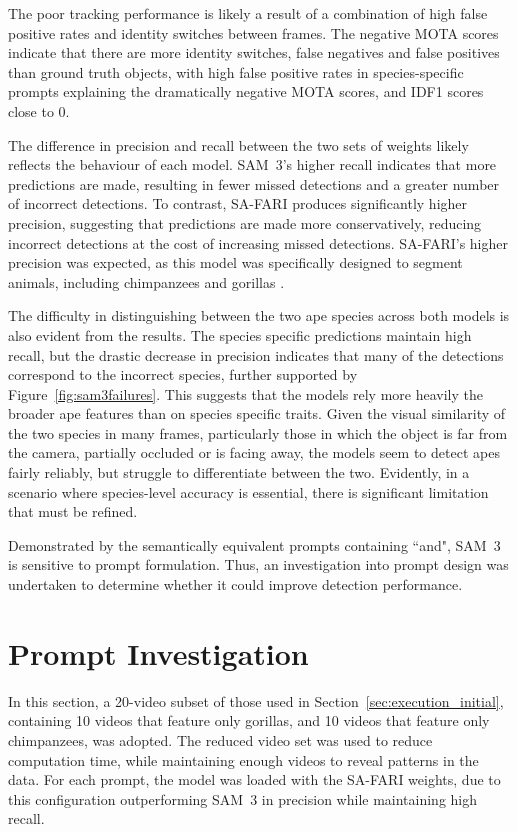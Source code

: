 \documentclass[author={Jacob Stephenson},
    degree={BSc},
    title={Robust Great Ape Species Detection in Wild Camera Trap Imagery with Promptable Concept Segmentation},
    unit={COMS30045},
    subtitle={}]{dissertation}
\begin{document}
The poor tracking performance is likely a result of a combination of high false positive rates and identity switches between frames. The negative MOTA scores indicate that there are more identity switches, false negatives and false positives than ground truth objects, with high false positive rates in species-specific prompts explaining the dramatically negative MOTA scores, and IDF1 scores close to 0.

The difference in precision and recall between the two sets of weights likely reflects the behaviour of each model. SAM~3's higher recall indicates that more predictions are made, resulting in fewer missed detections and a greater number of incorrect detections. To contrast, SA-FARI produces significantly higher precision, suggesting that predictions are made more conservatively, reducing incorrect detections at the cost of increasing missed detections. SA-FARI's higher precision was expected, as this model was specifically designed to segment animals, including chimpanzees and gorillas \cite{wasmuht2025safaridatasetsegmentfootage}.


The difficulty in distinguishing between the two ape species across both models is also evident from the results. The species specific predictions maintain high recall, but the drastic decrease in precision indicates that many of the detections correspond to the incorrect species, further supported by Figure~\ref{fig:sam3failures}. This suggests that the models rely more heavily the broader ape features than on species specific traits. Given the visual similarity of the two species in many frames, particularly those in which the object is far from the camera, partially occluded or is facing away, the models seem to detect apes fairly reliably, but struggle to differentiate between the two. Evidently, in a scenario where species-level accuracy is essential, there is significant limitation that must be refined.

Demonstrated by the semantically equivalent prompts containing ``and", SAM~3 is sensitive to prompt formulation. Thus, an investigation into prompt design was undertaken to determine whether it could improve detection performance.


\section{Prompt Investigation}
\label{sec:execution_prompt}

In this section, a 20-video subset of those used in Section~\ref{sec:execution_initial}, containing 10 videos that feature only gorillas, and 10 videos that feature only chimpanzees, was adopted. The reduced video set was used to reduce computation time, while maintaining enough videos to reveal patterns in the data. For each prompt, the model was loaded with the SA-FARI weights, due to this configuration outperforming SAM~3 in precision while maintaining high recall.    
\end{document}
